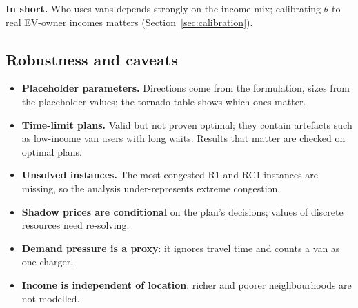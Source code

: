 \documentclass[11pt,a4paper]{article}
\newcommand{\inshort}[1]{\begin{insum}\textbf{In short.} #1\end{insum}}
\begin{document}
\inshort{Who uses vans depends strongly on the income mix; calibrating $\theta$ to real EV-owner incomes matters (Section~\ref{sec:calibration}).}

\subsection{Robustness and caveats}
\label{sec:robust}
\begin{itemize}
  \item \textbf{Placeholder parameters.} Directions come from the formulation, sizes from the placeholder values; the tornado table shows which ones matter.
  \item \textbf{Time-limit plans.} Valid but not proven optimal; they contain artefacts such as low-income van users with long waits. Results that matter are checked on optimal plans.
  \item \textbf{Unsolved instances.} The most congested R1 and RC1 instances are missing, so the analysis under-represents extreme congestion.
  \item \textbf{Shadow prices are conditional} on the plan's decisions; values of discrete resources need re-solving.
  \item \textbf{Demand pressure is a proxy}: it ignores travel time and counts a van as one charger.
  \item \textbf{Income is independent of location}: richer and poorer neighbourhoods are not modelled.
\end{itemize}

\end{document}
